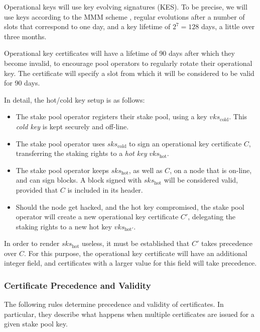 \documentclass[11pt,a4paper,dvipsnames,twosided]{article}
\begin{document}
Operational keys will use key evolving signatures (KES). To be precise, we will
use keys according to the MMM scheme \citep{cryptoeprint:2001:034}, regular
evolutions after a number of slots that correspond to one day, and a key
lifetime of \(2^7 = 128\) days, a little over three months.

Operational key certificates will have a lifetime of 90 days after which they
become invalid, to encourage pool operators to regularly rotate their
operational key. The certificate will specify a slot from which it will be
considered to be valid for 90 days.

In detail, the hot/cold key setup is as follows:

\begin{itemize}
\item
  The stake pool operator registers their stake pool, using a key
  \(vks_\text{cold}\). This \emph{cold key} is kept securely and
  off-line.
\item The stake pool operator uses \(sks_\text{cold}\)
  to sign an operational key certificate \(C\),
  transferring the staking rights to a \emph{hot key}
  \(vks_\text{hot}\).
\item
  The stake pool operator keeps \(sks_\text{hot}\), as well as \(C\), on
  a node that is on-line, and can sign blocks. A block signed with
  \(sks_\text{hot}\) will be considered valid, provided that \(C\) is
  included in its header.
\item
  Should the node get hacked, and the hot key compromised, the stake
  pool operator will create a new operational key certificate
  \(C'\), delegating the staking rights to a new hot key
  \(vks_{\text{hot}'}\).
\end{itemize}

In order to render \(sks_\text{hot}\) useless, it must be established
that \(C'\) takes precedence over \(C\). For this purpose, the
operational key certificate will have an additional integer
field, and certificates with a larger value for this field will take
precedence.

\subsubsection{Certificate Precedence and Validity}
\label{certificate-precedence-and-validity}

The following rules determine precedence and validity of certificates.
In particular, they describe what happens when multiple certificates are
issued for a given stake pool key.
\end{document}
